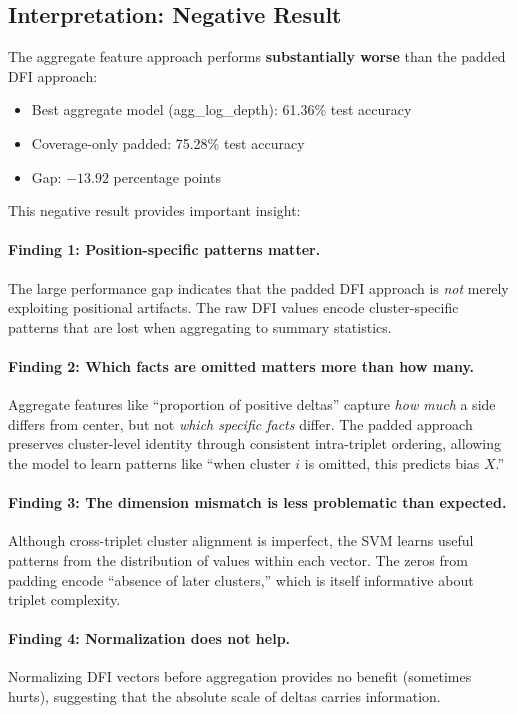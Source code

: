 \documentclass[12pt,a4paper]{article}
\begin{document}
\subsection{Interpretation: Negative Result}

The aggregate feature approach performs \textbf{substantially worse} than the padded DFI approach:

\begin{itemize}
\item Best aggregate model (agg\_log\_depth): 61.36\% test accuracy
\item Coverage-only padded: 75.28\% test accuracy
\item Gap: $-13.92$ percentage points
\end{itemize}

This negative result provides important insight:

\paragraph{Finding 1: Position-specific patterns matter.}
The large performance gap indicates that the padded DFI approach is \textit{not} merely
exploiting positional artifacts. The raw DFI values encode cluster-specific patterns
that are lost when aggregating to summary statistics.

\paragraph{Finding 2: Which facts are omitted matters more than how many.}
Aggregate features like ``proportion of positive deltas'' capture \textit{how much}
a side differs from center, but not \textit{which specific facts} differ.
The padded approach preserves cluster-level identity through consistent intra-triplet
ordering, allowing the model to learn patterns like ``when cluster $i$ is omitted,
this predicts bias $X$.''

\paragraph{Finding 3: The dimension mismatch is less problematic than expected.}
Although cross-triplet cluster alignment is imperfect, the SVM learns useful patterns
from the distribution of values within each vector. The zeros from padding encode
``absence of later clusters,'' which is itself informative about triplet complexity.

\paragraph{Finding 4: Normalization does not help.}
Normalizing DFI vectors before aggregation provides no benefit (sometimes hurts),
suggesting that the absolute scale of deltas carries information.
\end{document}
